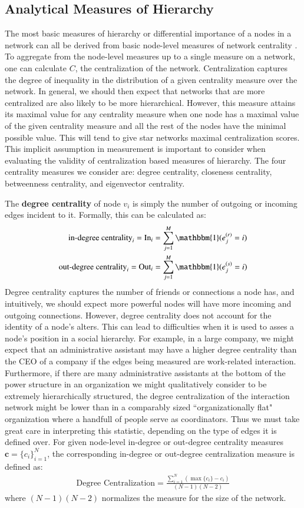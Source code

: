 \documentclass[3p,times]{elsarticle}
\begin{document}
\subsection{Analytical Measures of Hierarchy}
The most basic measures of hierarchy or differential importance of a nodes in a network can all be derived from basic node-level measures of network centrality \cite{Wasserman1994}. To aggregate from the node-level measures up to a single measure on a network, one can calculate $C$, the centralization of the network. Centralization captures the degree of inequality in the distribution of a given centrality measure over the network. In general, we should then expect that networks that are more centralized are also likely to be more hierarchical. However, this measure attains its maximal value for any centrality measure when one node has a maximal value of the given centrality measure and all the rest of the nodes have the minimal possible value. This will tend to give star networks maximal centralization scores. This implicit assumption in measurement is important to consider when evaluating the validity of centralization based measures of hierarchy. The four centrality measures we consider are: degree centrality, closeness centrality, betweenness centrality, and eigenvector centrality. 

The \textbf{degree centrality} of node $v_{i}$ is simply the number of outgoing or incoming edges incident to it. Formally, this can be calculated as:
\begin{align}
	\text{in-degree centrality}_i = \text{In}_i&= \sum_{j=1}^M \mathbbm{1}(e_j^{(r)} = i) \\
	\text{out-degree centrality}_i  = \text{Out}_i &= \sum_{j=1}^M \mathbbm{1}(e_j^{(s)} = i) 
\end{align}
Degree centrality captures the number of friends or connections a node has, and intuitively, we should expect more powerful nodes will have more incoming and outgoing connections. However, degree centrality does not account for the identity of a node's alters. This can lead to difficulties when it is used to asses a node's position in a social hierarchy. For example, in a large company, we might expect that an administrative assistant may have a higher degree centrality than the CEO of a company if the edges being measured are work-related interaction. Furthermore, if there are many administrative assistants at the bottom of the power structure in an organization we might qualitatively consider to be extremely hierarchically structured, the degree centralization of the interaction network might be lower than in a comparably sized ``organizationally flat" organization where a handfull of people serve as coordinators. Thus we must take great care in interpreting this statistic, depending on the type of edges it is defined over. For given node-level in-degree or out-degree centrality measures $\mathbf{c} = \{c_i\}_{i=1}^N$, the corresponding in-degree or out-degree centralization measure is defined as: 
\begin{align}
	\text{Degree Centralization} = \frac{\sum_{i=1}^{N}{(\max\{c_{i}\}-c_{i})}}{(N-1)(N-2)}
\end{align}
where $(N-1)(N-2)$ normalizes the measure for the size of the network.
\end{document}
